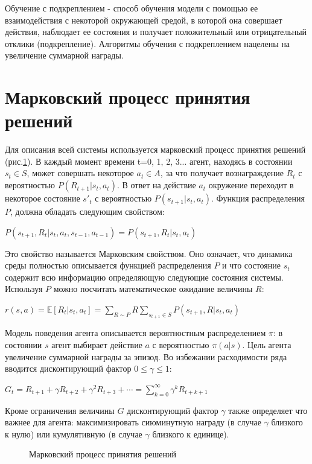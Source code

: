 \documentclass{mipt-thesis-bs}
\begin{document}
Обучение с подкреплением - способ обучения модели с помощью ее взаимодействия с некоторой окружающей средой, в которой она совершает действия, наблюдает ее состояния и получает положительный или отрицательный отклики (подкрепление). Алгоритмы обучения с подкреплением нацелены на увеличение суммарной награды.

\section{Марковский процесс принятия решений}
Для описания всей системы используется марковский процесс принятия решений (рис.\ref{mdp}). В каждый момент времени t=0, 1, 2, 3... агент, находясь в состоянии $s_t\in S$, может совершать некоторое $a_t\in A$, за что получает вознаграждение $R_t$ с вероятностью $P(R_{t+1}|s_t,a_t)$. В ответ на действие $a_t$ окружение переходит в некоторое состояние $s'_t$ с вероятностью $P(s_{t+1}|s_t,a_t)$. Функция распределения $P$, должна обладать следующим свойством:

$P(s_{t+1}, R_{t}|s_t,a_t,s_{t-1},a_{t-1}) = P(s_{t+1}, R_{t}|s_t,a_t)$

Это свойство называется Марковским свойством. Оно означает, что динамика среды полностью описывается функцией распределения $P$ и что состояние $s_t$ содержит всю информацию определяющую следующие состояния системы. Используя $P$ можно посчитать математическое ожидание величины $R$:

$r(s, a) = \mathbb{E}[R_{t} | s_t, a_t]=\sum_{R \sim P} R \sum_{s_{t+1} \in S} P(s_{t+1}, R | s_t, a_t)$

Модель поведения агента описывается вероятностным распределением $\pi$: в состоянии $s$ агент выбирает действие $a$ с вероятностью $\pi(a|s)$. Цель агента увеличение суммарной награды за эпизод. Во избежании расходимости ряда вводится дисконтирующий фактор $0 \leq\gamma\leq 1$:

$G_{t} = R_{t+1}+\gamma R_{t+2}+\gamma^{2} R_{t+3}+\cdots=\sum_{k=0}^{\infty} \gamma^{k} R_{t+k+1}$

Кроме ограничения величины $G$ дисконтирующий фактор $\gamma$ также определяет что важнее для агента: максимизировать сиюминутную награду (в случае $\gamma$ близкого к нулю) или кумулятивную (в случае $\gamma$ близкого к единице).

\begin{figure}[ht]
    \centering
    \vspace{-0.2cm}
    \caption{Марковский процесс принятия решений}
    \label{mdp}
\end{figure}
\end{document}
